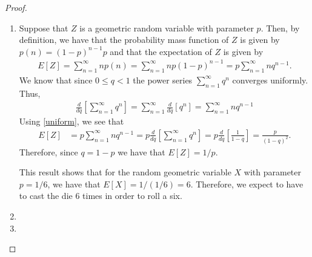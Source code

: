 \begin{proof}
  \begin{enumerate}
    \item Suppose that $Z$ is a geometric random variable with parameter $p$.
      Then, by definition, we have that the probability mass function of $Z$ is
      given by $p(n) = (1-p)^{n-1}p$ and that the expectation of $Z$ is given by
      \begin{align*}
        E[Z] = \sum_{n=1}^\infty n p(n) = \sum_{n=1}^\infty np(1-p)^{n-1} = p\sum_{n=1}^\infty nq^{n-1}.
      \end{align*}
      We know that since $0 \leq q < 1$ the power series $\sum_{n=1}^\infty q^{n}$ converges uniformly. Thus,
      \begin{align}\label{uniform}
        \frac{d}{dq}\left[\sum_{n=1}^\infty q^n\right] = \sum_{n=1}^\infty \frac{d}{dq}\left[q^n\right] = \sum_{n=1}^\infty n q^{n-1}
      \end{align}
      Using \eqref{uniform}, we see that
      \begin{align*}
        E[Z] &= p\sum_{n=1}^\infty nq^{n-1} = p \frac{d}{dq}\left[\sum_{n=1}^\infty q^n\right] = p \frac{d}{dq}\left[\frac{1}{1-q}\right] = \frac{p}{(1-q)^2}.
      \end{align*}
      Therefore, since $q = 1 - p$ we have that $E[Z] = 1/p$.

      This result shows that for the random geometric variable $X$ with parameter $p = 1/6$,
      we have that $E[X] = 1 / (1/6) = 6$. Therefore, we expect to have to cast the die 6
      times in order to roll a six.
    \item
    \item
  \end{enumerate}
\end{proof}
\newpage
